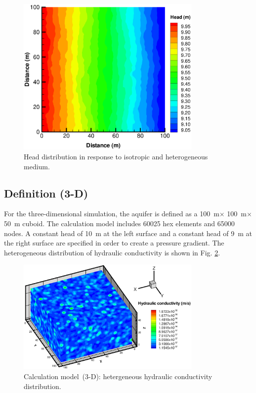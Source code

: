 \begin{figure}[htb]
\centering
\vspace{-10pt}
\includegraphics[width=0.8\textwidth]{Chapter5/figure/HeadDis.eps}
\vspace{-10pt}
\caption{Head distribution in response to isotropic and heterogeneous medium.}
\label{HeadDis}
\end{figure}

\subsection{Definition (3-D)}

For the three-dimensional simulation, the aquifer is defined as a 100~m$\times$ 100~m$\times$ 50~m cuboid. The calculation model includes 60025 hex elements and 65000 nodes.  A constant head of 10~m at the left surface and a constant head of 9~m at the right surface are specified in order to create a pressure gradient. The heterogeneous distribution of hydraulic conductivity is shown in Fig. \ref{KDis3d}.

\newpage

\begin{figure}[htb]
\centering
\vspace{-40pt}
\includegraphics[width=0.8\textwidth]{Chapter5/figure/3DHGWH.eps}
\vspace{-20pt}
\caption{Calculation model~(3-D): hetergeneous hydraulic conductivity distribution.}
\vspace{-10pt}
\label{KDis3d}
\end{figure}

